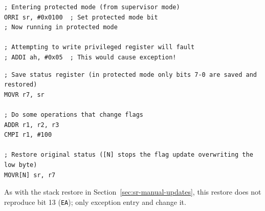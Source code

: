 \begin{example}
	\begin{lstlisting}
; Entering protected mode (from supervisor mode)
ORRI sr, #0x0100  ; Set protected mode bit
; Now running in protected mode

; Attempting to write privileged register will fault
; ADDI ah, #0x05  ; This would cause exception!
	\end{lstlisting}
	\caption{Enabling Protected Mode}
\end{example}

\begin{example}
	\begin{lstlisting}
; Save status register (in protected mode only bits 7-0 are saved and restored)
MOVR r7, sr

; Do some operations that change flags
ADDR r1, r2, r3
CMPI r1, #100

; Restore original status ([N] stops the flag update overwriting the low byte)
MOVR[N] sr, r7
	\end{lstlisting}
	\caption{Saving and Restoring Status}
\end{example}

As with the stack restore in Section~\ref{sec:sr-manual-updates}, this restore does not reproduce bit 13 (\texttt{EA});
only exception entry and  change it.
